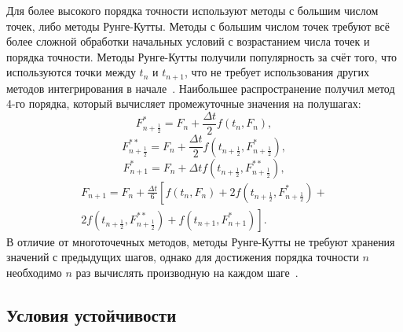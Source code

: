 Для более высокого порядка точности используют методы с большим числом точек, либо методы Рунге-Кутты. 
Методы с большим числом точек требуют всё более сложной обработки начальных условий с возрастанием числа точек и порядка точности. 
Методы Рунге-Кутты получили популярность за счёт того, что используются точки между $t_{n}$ и $t_{n+1}$, 
что не требует использования других методов интегрирования в начале~\cite{Ferziger2002}.
Наибольшее распространение получил метод 4-го порядка, который вычисляет промежуточные значения на полушагах:
%
\begin{equation}
    F^{*}_{n+\frac{1}{2}} = 
    F_{n} + \frac{\Delta t}{2} f\left(t_{n}, F_{n}\right),
\end{equation}
%
\begin{equation}
    F^{**}_{n+\frac{1}{2}} =
    F_{n} + \frac{\Delta t}{2} f\left(t_{n+\frac{1}{2}},     F^{*}_{n+\frac{1}{2}}\right),
\end{equation}
%
\begin{equation}
    F^{*}_{n+1} = F_{n} +
    \Delta t f\left(t_{n+\frac{1}{2}}, F^{**}_{n+\frac{1}{2}}\right),
\end{equation}
%
\begin{multline}
    F_{n+1} = F_{n} + \frac{\Delta t}{6} 
    \left[ 
    f\left(t_{n},F_{n}\right) 
    + 
    2f\left(t_{n+\frac{1}{2}}, F^{*}_{n+\frac{1}{2}}\right) 
    +
    \right.
    \\
    \left.
    2f\left(t_{n+\frac{1}{2}},F^{**}_{n+\frac{1}{2}}\right) 
    +
    f\left(t_{n+1},F^{*}_{n+1}\right)
    \right].
\end{multline}
%
В отличие от многоточечных методов, методы Рунге-Кутты не требуют хранения значений с предыдущих шагов, 
однако для достижения порядка точности $n$ необходимо $n$ раз вычислять производную на каждом шаге~\cite{Ferziger2002}.

\subsection{Условия устойчивости}

